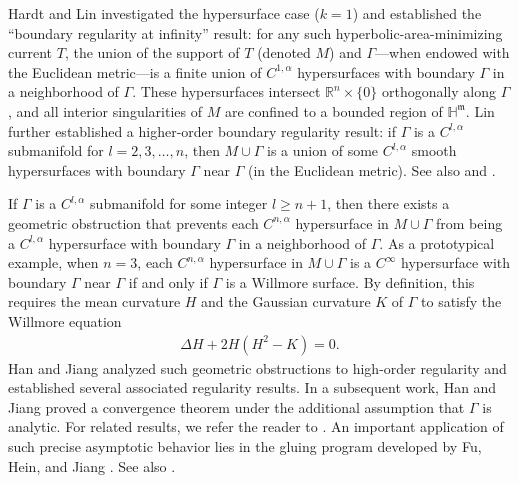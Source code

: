 \documentclass[11pt,reqno]{amsart}
\newcommand{\fm}{\mathfrak{m}}
\renewcommand{\geq}{\geqslant}
\theoremstyle{definition}
\numberwithin{equation}{section}
\begin{document}
Hardt and Lin \cite{Hardt&Lin1987} investigated the hypersurface case ($k=1$) and established the ``boundary regularity at infinity'' result: for any such hyperbolic-area-minimizing current $T$, the union of the support of $T$ (denoted $M$) and $\Gamma$—when endowed with the Euclidean metric—is a finite union of $C^{1,\alpha}$ hypersurfaces with boundary $\Gamma$ in a neighborhood of $\Gamma$. These hypersurfaces intersect $\mathbb{R}^n \times \{0\}$ orthogonally along $\Gamma$, and all interior singularities of $M$ are confined to a bounded region of $\mathbb{H}^\fm$. 
Lin \cite{Lin1989Invent} further established a higher-order boundary regularity result: if $\Gamma$ is a $C^{l,\alpha}$ submanifold for $l = 2, 3, \dots, n$, then $M \cup \Gamma$ is a union of some $C^{l,\alpha}$ smooth hypersurfaces with boundary $\Gamma$ near $\Gamma$ (in the Euclidean metric). See also \cite{Tonegawa1996MathZ} and \cite{Lin2012Invent}.

If $\Gamma$ is a $C^{l,\alpha}$ submanifold for some integer $l \geq n+1$, then there exists a geometric obstruction that prevents each $C^{n,\alpha}$ hypersurface in  $M\cup\Gamma$ from being a $C^{l,\alpha}$ hypersurface with boundary $\Gamma$ in a neighborhood of $\Gamma$. As a prototypical example, when $n=3$, each $C^{n,\alpha}$ hypersurface in $M\cup\Gamma$ is a $C^\infty$ hypersurface with boundary $\Gamma$ near $\Gamma$ if and only if $\Gamma$ is a Willmore surface. By definition, this requires the mean curvature $H$ and the Gaussian curvature $K$ of $\Gamma$ to satisfy the Willmore equation
\begin{align}
    \Delta H + 2H(H^2 - K)=0.
\end{align}
Han and Jiang \cite{HanJiang2023} analyzed such geometric obstructions to high-order regularity and established several associated regularity results. 
In a subsequent work, Han and Jiang \cite{HanJiang1} proved a convergence theorem under the additional assumption that $\Gamma$ is analytic. For related results, we refer the reader to \cite{FHJ1, HanJiang2024, HanXie, JiangShi, JiangXiao}. An important application of such precise asymptotic behavior lies in the gluing program developed by Fu, Hein, and Jiang \cite{FHJ2}. See also \cite{JSZ}.
\end{document}
